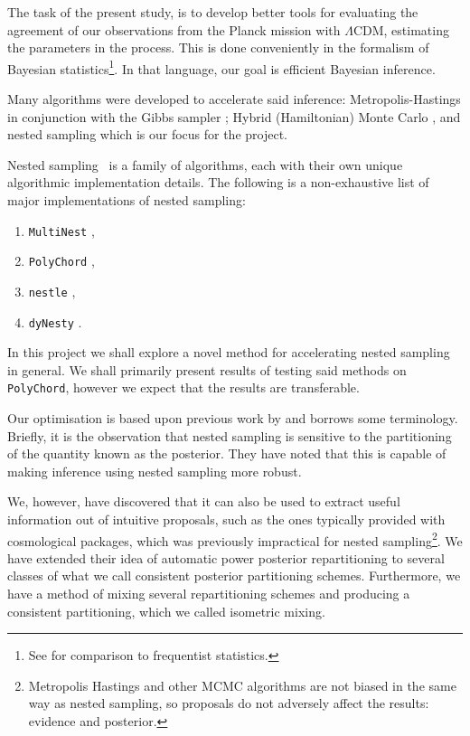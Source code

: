 \documentclass[usenatbib]{mnras}
\begin{document}
The task of the present study, is to develop better tools for
evaluating the agreement of our observations from the Planck mission
with \(\Lambda\)CDM, estimating the parameters in the process.  This
is done conveniently in the formalism of Bayesian
statistics\footnote{See \cite{xkcd} for comparison to frequentist
  statistics.}. In that language, our goal is efficient Bayesian
inference.

Many algorithms were developed to accelerate said inference:
Metropolis-Hastings \citep{Metropolis} in conjunction with the Gibbs
sampler \citep{Metropolis-Hastings-Gibbs}; Hybrid (Hamiltonian) Monte
Carlo \citep{1701.02434,Duane_1987}, and nested sampling
\citep{Skilling2006} which is our focus for the project.

Nested sampling~\cite{Skilling2006} is a family of algorithms, each
with their own unique algorithmic implementation details. The
following is a non-exhaustive list of major implementations of nested
sampling:
\begin{enumerate}
\item \texttt{MultiNest} \citep{Feroz2009MultiNestAE},
\item \texttt{PolyChord} \citep{polychord},
\item \texttt{nestle} \citep{nestle},
\item \texttt{dyNesty} \citep{Speagle_2020}.
\end{enumerate}
In this project we shall explore a novel method for accelerating
nested sampling in general. We shall primarily present results of
testing said methods on \texttt{PolyChord}, however we expect that the
results are transferable.

Our optimisation is based upon previous work by
\cite{chen-ferroz-hobson} and borrows some terminology. Briefly,
it is the observation that nested sampling is sensitive to the
partitioning of the quantity known as the posterior. They have noted
that this is capable of making inference using nested sampling more
robust.

We, however, have discovered that it can also be used to extract
useful information out of intuitive proposals, such as the ones
typically provided with cosmological packages, which was previously
impractical for nested sampling\footnote{Metropolis Hastings and other
  MCMC algorithms are not biased in the same way as nested sampling,
  so proposals do not adversely affect the results: evidence and
  posterior. }.  We have extended their idea of automatic power
posterior repartitioning to several classes of what we call consistent
posterior partitioning schemes. Furthermore, we have a method of
mixing several repartitioning schemes and producing a consistent
partitioning, which we called isometric mixing.
\end{document}
